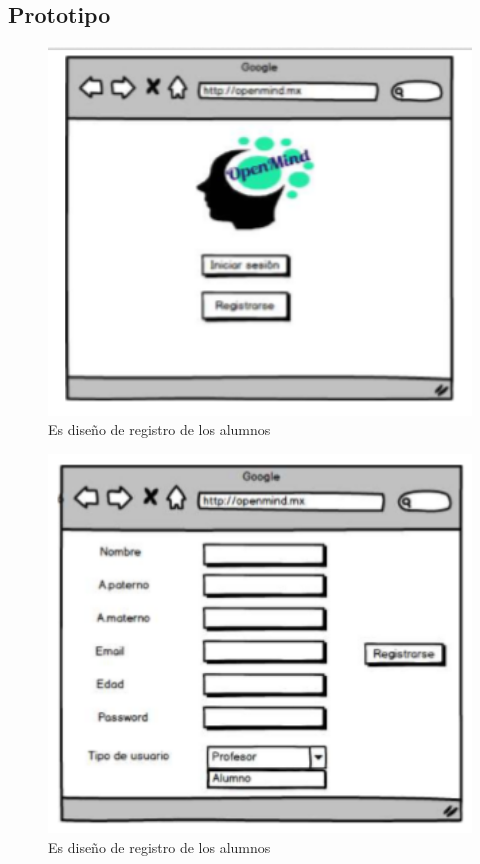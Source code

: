 \documentclass[letterpaper,oneside,openany,11pt]{book}
\begin{document}
\subsection{Prototipo}

 \begin{figure}[H]
	\centering
	\includegraphics[width=1.0\textwidth]{./Imagenes/35}
	\caption{Es diseño de registro de los alumnos}
\end{figure}

 \begin{figure}[H]
	\centering
	\includegraphics[width=1.0\textwidth]{./Imagenes/36}
	\caption{Es diseño de registro de los alumnos}
\end{figure}
\end{document}
